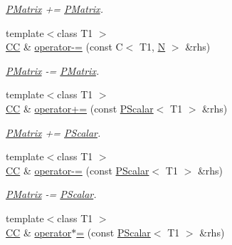 \begin{DoxyCompactItemize}
\begin{DoxyCompactList}\small\item\em \mbox{\hyperlink{classENSEM_1_1PMatrix}{P\+Matrix}} += \mbox{\hyperlink{classENSEM_1_1PMatrix}{P\+Matrix}}. \end{DoxyCompactList}\item 
{\footnotesize template$<$class T1 $>$ }\\\mbox{\hyperlink{classENSEM_1_1PMatrix_a744bac549029029effe32dc1705660ec}{CC}} \& \mbox{\hyperlink{classENSEM_1_1PMatrix_a76fa178c64fa75b73925016654a08766}{operator-\/=}} (const C$<$ T1, \mbox{\hyperlink{operator__name__util_8cc_a7722c8ecbb62d99aee7ce68b1752f337}{N}} $>$ \&rhs)
\begin{DoxyCompactList}\small\item\em \mbox{\hyperlink{classENSEM_1_1PMatrix}{P\+Matrix}} -\/= \mbox{\hyperlink{classENSEM_1_1PMatrix}{P\+Matrix}}. \end{DoxyCompactList}\item 
{\footnotesize template$<$class T1 $>$ }\\\mbox{\hyperlink{classENSEM_1_1PMatrix_a744bac549029029effe32dc1705660ec}{CC}} \& \mbox{\hyperlink{classENSEM_1_1PMatrix_a141db586d4797230e05d41ab13c12a1e}{operator+=}} (const \mbox{\hyperlink{classENSEM_1_1PScalar}{P\+Scalar}}$<$ T1 $>$ \&rhs)
\begin{DoxyCompactList}\small\item\em \mbox{\hyperlink{classENSEM_1_1PMatrix}{P\+Matrix}} += \mbox{\hyperlink{classENSEM_1_1PScalar}{P\+Scalar}}. \end{DoxyCompactList}\item 
{\footnotesize template$<$class T1 $>$ }\\\mbox{\hyperlink{classENSEM_1_1PMatrix_a744bac549029029effe32dc1705660ec}{CC}} \& \mbox{\hyperlink{classENSEM_1_1PMatrix_ad33381d53cc105f6f64869316aa0e2c2}{operator-\/=}} (const \mbox{\hyperlink{classENSEM_1_1PScalar}{P\+Scalar}}$<$ T1 $>$ \&rhs)
\begin{DoxyCompactList}\small\item\em \mbox{\hyperlink{classENSEM_1_1PMatrix}{P\+Matrix}} -\/= \mbox{\hyperlink{classENSEM_1_1PScalar}{P\+Scalar}}. \end{DoxyCompactList}\item 
{\footnotesize template$<$class T1 $>$ }\\\mbox{\hyperlink{classENSEM_1_1PMatrix_a744bac549029029effe32dc1705660ec}{CC}} \& \mbox{\hyperlink{classENSEM_1_1PMatrix_a4c25aeda146eb61d41abf6cf625a6153}{operator$\ast$=}} (const \mbox{\hyperlink{classENSEM_1_1PScalar}{P\+Scalar}}$<$ T1 $>$ \&rhs)

\end{DoxyCompactItemize}
